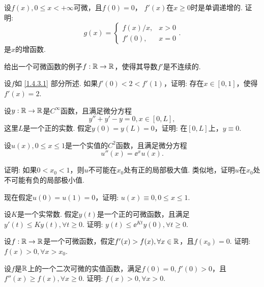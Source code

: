 \begin{example}
  设$f(x),0\le x<+\infty$可微，且$f(0)=0$， $f'(x)$在$x\ge0$时是单调递增的. 证明:
  \[ g(x)=\begin{cases}
    f(x)/x, & x>0\\
    f'(0),  & x=0
  \end{cases}. \]
  是$x$的增函数.
\end{example}

\begin{example}
  \begin{enuma}
   \item 给出一个可微函数的例子$f:\mathbb R\to\mathbb R$，使得其导数$f'$是不连续的.
   \item 设$f$如 \ref{1.4.3.1} 部分所述. 如果$f'(0)<2<f'(1)$，证明: 存在$x\in[0,1]$，使得$f'(x)=2$.
  \end{enuma}
\end{example}

\begin{example}
  设$y:\mathbb R\to\mathbb R$是$C^\infty$函数，且满足微分方程
  \[ y''+y'-y=0,x\in[0,L], \]
  这里$L$是一个正的实数. 假定$y(0)=y(L)=0$，证明: 在$[0,L]$上，$y\equiv0$.
\end{example}

\begin{example}
  设$u(x),0\le x\le 1$是一个实值的$C^2$函数，且满足微分方程
  \[ u''(x)=\ee^x u(x). \]
  \begin{eenum}
    \item 证明: 如果$0<x_0<1$，则$u$不可能在$x_0$处有正的局部极大值. 类似地，证明$u$在$x_0$处不可能有负的局部极小值.
    \item 现在假定$u(0)=u(1)=0$，证明: $u(x)\equiv0,0\le x\le1$.
  \end{eenum}
\end{example}

\begin{example}
  设$K$是一个实常数. 假定$y(t)$是一个正的可微函数，且满足$y'(t)\le Ky(t),\forall t\ge0$. 证明: $y(t)\le \ee^{Kt}y(0),\forall t\ge0$.
\end{example}

\begin{example}
  设$f:\mathbb R\to\mathbb R$是一个可微函数，假定$f'(x)>f(x),\forall x\in\mathbb R$，且$f(x_0)=0$. 证明: $f(x)>0,\forall x>x_0$.
\end{example}

\begin{example}
  设$f$是$\mathbb R$上的一个二次可微的实值函数，满足$f(0)=0,f'(0)>0$，且$f''(x)\ge f(x),\forall x\ge0$. 证明: $f(x)>0,\forall x>0$.
\end{example}

